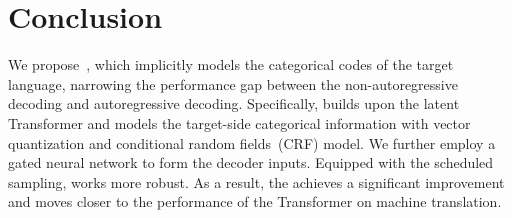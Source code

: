\section{Conclusion}
We propose~\method, which implicitly models the categorical codes of the target language, narrowing the performance gap between the non-autoregressive decoding and autoregressive decoding.
Specifically, \method builds upon the latent Transformer and models the target-side categorical information with vector quantization and conditional random fields~(CRF) model. 
We further employ a gated neural network to form the decoder inputs. Equipped with the scheduled sampling, \method works more robust.
As a result, the \method achieves a significant improvement and moves closer to the performance of the Transformer on machine translation.